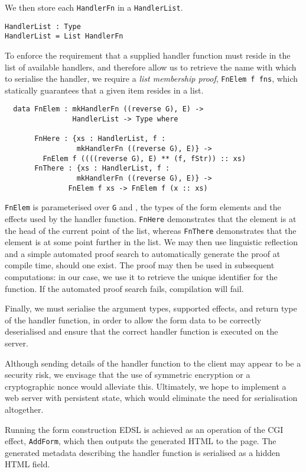 \documentclass[preprint]{sigplanconf}
\begin{document}
We then store each \texttt{HandlerFn} in a \texttt{HandlerList}.
\begin{Verbatim}
HandlerList : Type
HandlerList = List HandlerFn
\end{Verbatim}
To enforce the requirement that a supplied handler function must reside in the list of available handlers, and therefore allow us to retrieve the name with which to serialise the handler, we require a \textit{list membership proof},  \texttt{FnElem f fns}, which statically guarantees that a given item resides in a list.
\begin{Verbatim}
  data FnElem : mkHandlerFn ((reverse G), E) -> 
                HandlerList -> Type where
                
       FnHere : {xs : HandlerList, f : 
                 mkHandlerFn ((reverse G), E)} ->
         FnElem f ((((reverse G), E) ** (f, fStr)) :: xs)
       FnThere : {xs : HandlerList, f : 
                 mkHandlerFn ((reverse G), E)} ->
               FnElem f xs -> FnElem f (x :: xs)
\end{Verbatim}
\texttt{FnElem} is parameterised over \texttt{G} and , the types of the form elements and the effects used by the handler function. \texttt{FnHere} demonstrates that the element is at the head of the current point of the list, whereas \texttt{FnThere} demonstrates that the element is at some point further in the list. %
We may then use linguistic reflection and a simple automated proof search to automatically generate the proof at compile time, should one exist. The proof may then be used in subsequent computations: in our case, we use it to retrieve the unique identifier for the function. If the automated proof search fails, compilation will fail.

Finally, we must serialise the argument types, supported effects, and return type of the handler function, in order to allow the form data to be correctly deserialised and ensure that the correct handler function is executed on the server. 

Although sending details of the handler function to the client may appear to be a security risk, we envisage that the use of symmetric encryption or a cryptographic nonce would alleviate this. Ultimately, we hope to implement a web server with persistent state, which would eliminate the need for serialisation altogether.

Running the form construction EDSL is achieved as an operation of the CGI effect, \texttt{AddForm}, which then outputs the generated HTML to the page. The generated metadata describing the handler function is serialised as a hidden HTML field.
\end{document}
